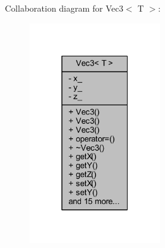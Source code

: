 Collaboration diagram for Vec3$<$ T $>$\+:
\nopagebreak
\begin{figure}[H]
\begin{center}
\leavevmode
\includegraphics[width=160pt]{class_vec3__coll__graph}
\end{center}
\end{figure}
